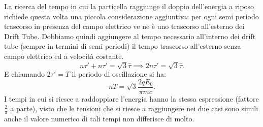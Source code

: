 La ricerca del tempo in cui la particella raggiunge il doppio dell'energia a riposo richiede questa volta una piccola considerazione aggiuntiva: per ogni semi periodo trascorso in presenza del campo elettrico ve ne è uno trascorso all'esterno dei Drift Tube. Dobbiamo quindi aggiungere al tempo necessario all'interno dei drift tube (sempre in termini di semi periodi) il tempo trascorso all'esterno senza campo elettrico ed a velocità costante.
\[
	n\tau' + n\tau' = \sqrt{3}\hat{\tau} \implies 2n\tau' = \sqrt{3} \hat{\tau}
.\] 
E chiamando $2\tau'= T$ il periodo di oscillazione si ha:
\[
	nT = \sqrt{3}\frac{2qE_0}{\pi mc}
.\] 
I tempi in cui si riesce a raddoppiare l'energia hanno la stessa espressione  (fattore $\frac{2}{\pi}$ a parte), visto che le tensioni che si riesce a raggiungere nei due casi sono simili anche il valore numerico di tali tempi non differisce di molto.

